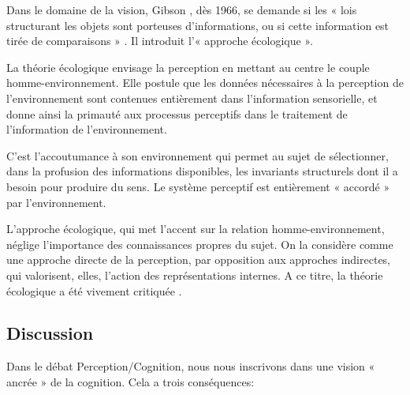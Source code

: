Dans le domaine de la vision, Gibson \citep{gibson1966senses}, dès 1966, se demande si les « lois structurant les objets sont porteuses d'informations, ou si cette information est tirée de comparaisons  » \citep{gibson1978ecological}. Il introduit l'« approche écologique ». 

La théorie écologique envisage la perception en mettant au centre le couple homme-environnement. Elle postule que les données nécessaires à la perception de l'environnement sont contenues entièrement dans l'information sensorielle, et donne ainsi la primauté aux processus perceptifs dans le traitement de l'information de l'environnement.

C'est l'accoutumance à son environnement qui permet au sujet de sélectionner, dans la profusion des informations disponibles, les invariants structurels dont il a besoin pour produire du sens. Le système perceptif est entièrement « accordé » par l'environnement.

L'approche écologique, qui met l'accent sur la relation homme-environnement, néglige l'importance des connaissances propres du sujet. On la considère comme une approche directe de la perception, par opposition aux approches indirectes, qui valorisent, elles, l'action des représentations internes. A ce titre, la théorie écologique a été vivement critiquée \citep{ullman1980against}.

\subsection{Discussion}
\label{sec:ch3_groundedCogDiscussion}

Dans le débat Perception/Cognition, nous nous inscrivons dans une vision « ancrée » de la cognition. Cela a trois conséquences:

